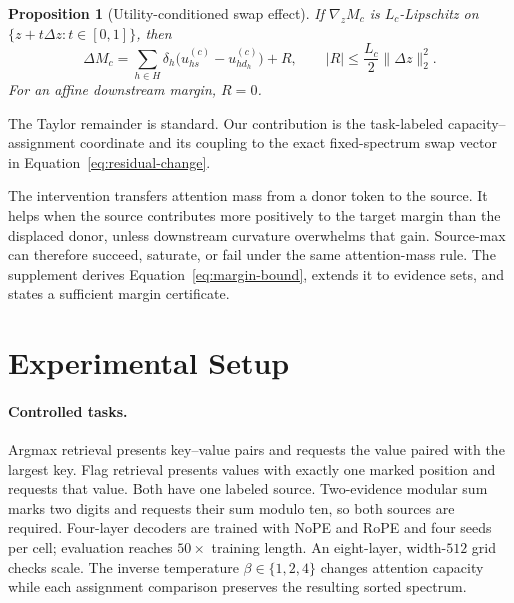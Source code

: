 \documentclass[letterpaper]{article} %
\newtheorem{proposition}{Proposition}
\begin{document}
\begin{proposition}[Utility-conditioned swap effect]
If $\nabla_z M_c$ is $L_c$-Lipschitz on $\{z+t\Delta z:t\in[0,1]\}$, then
\begin{equation}
 \Delta M_c=
 \sum_{h\in H}\delta_h\big(u_{hs}^{(c)}-u_{hd_h}^{(c)}\big)+R,
 \qquad |R|\le\frac{L_c}{2}\lVert\Delta z\rVert_2^2.
\label{eq:margin-bound}
\end{equation}
For an affine downstream margin, $R=0$.
\label{prop:utility}
\end{proposition}

The Taylor remainder is standard. Our contribution is the task-labeled capacity--assignment coordinate and
its coupling to the exact fixed-spectrum swap vector in Equation~\ref{eq:residual-change}.

The intervention transfers attention mass from a donor token to the source. It helps when the source
contributes more positively to the target margin than the displaced donor, unless downstream curvature
overwhelms that gain. Source-max can therefore succeed, saturate, or fail under the same attention-mass rule.
The supplement derives Equation~\ref{eq:margin-bound}, extends it to evidence sets, and states a sufficient
margin certificate.

\section{Experimental Setup}

\paragraph{Controlled tasks.}
Argmax retrieval presents key--value pairs and requests the value paired with the largest key. Flag retrieval
presents values with exactly one marked position and requests that value. Both have one labeled source.
Two-evidence modular sum marks two digits and requests their sum modulo ten, so both sources are required.
Four-layer decoders are trained with NoPE and RoPE and four seeds per cell; evaluation reaches $50\times$
training length. An eight-layer, width-$512$ grid checks scale. The inverse temperature $\beta\in\{1,2,4\}$
changes attention capacity while each assignment comparison preserves the resulting sorted spectrum.
\end{document}

